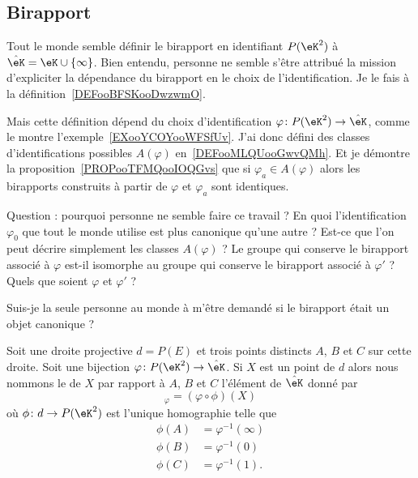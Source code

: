 \subsection{Birapport}

\begin{normaltext}
	Tout le monde semble définir le birapport en identifiant \( P(\eK^2)\) à \( \hat\eK=\eK\cup\{ \infty \}\). Bien entendu, personne ne semble s'être attribué la mission d'expliciter la dépendance du birapport en le choix de l'identification. Je le fais à la définition~\ref{DEFooBFSKooDwzwmO}.

	Mais cette définition dépend du choix d'identification \( \varphi\colon P(\eK^2)\to \hat\eK\), comme le montre l'exemple~\ref{EXooYCOYooWFSfUv}. J'ai donc défini des classes d'identifications possibles \( A(\varphi)\) en~\ref{DEFooMLQUooGwvQMh}. Et je démontre la proposition~\ref{PROPooTFMQooIOQGvs} que si \( \varphi_a\in A(\varphi)\) alors les birapports construits à partir de \( \varphi\) et \( \varphi_a\) sont identiques.

	Question : pourquoi personne ne semble faire ce travail ? En quoi l'identification \( \varphi_0\) que tout le monde utilise est plus canonique qu'une autre ? Est-ce que l'on peut décrire simplement les classes \( A(\varphi)\) ? Le groupe qui conserve le birapport associé à \( \varphi\) est-il isomorphe au groupe qui conserve le birapport associé à \( \varphi'\) ? Quels que soient \( \varphi\) et \( \varphi'\) ?

	Suis-je la seule personne au monde à m'être demandé si le birapport était un objet canonique ?
\end{normaltext}

\begin{propositionDef}      \label{DEFooBFSKooDwzwmO}
	Soit une droite projective \( d=P(E)\) et trois points distincts \( A\), \( B\) et \( C\) sur cette droite. Soit une bijection \( \varphi\colon P(\eK^2)\to \hat\eK\). Si \( X\) est un point de \( d\) alors nous nommons le  de \( X\) par rapport à \( A\), \( B\) et \( C\) l'élément de \( \hat\eK\) donné par
	\begin{equation}
		[A,B,C,X]_{\varphi}=(\varphi\circ\phi)(X)
	\end{equation}
	où \( \phi\colon d\to P(\eK^2) \) est l'unique homographie telle que
	\begin{subequations}        \label{SUBEQooYWMSooYlFKQv}
		\begin{align}
			\phi(A) & =\varphi^{-1}(\infty) \\
			\phi(B) & =\varphi^{-1}(0)      \\
			\phi(C) & =\varphi^{-1}(1).
		\end{align}
	\end{subequations}
\end{propositionDef}

